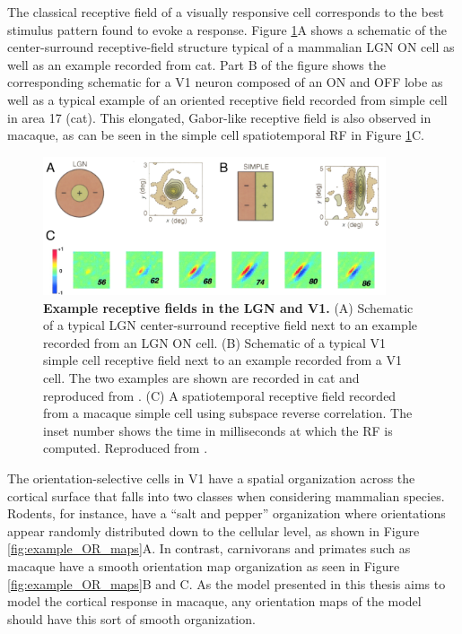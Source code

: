 \documentclass[phd,ianc,twoside]{infthesis}
\begin{document}
The classical receptive field of a visually responsive cell corresponds
to the best stimulus pattern found to evoke a response. Figure
\ref{fig:example_RFs}A shows a schematic of the center-surround
receptive-field structure typical of a mammalian LGN ON cell as well as
an example recorded from cat. Part B of the figure shows the
corresponding schematic for a V1 neuron composed of an ON and OFF lobe
as well as a typical example of an oriented receptive field recorded
from simple cell in area 17 (cat). This elongated, Gabor-like receptive
field is also observed in macaque, as can be seen in the simple cell
spatiotemporal RF in Figure \ref{fig:example_RFs}C.

\begin{figure}
\center
\includegraphics[width=0.9\textwidth]{./figures/example_RFs.pdf}
\caption{{\bf Example receptive fields in the LGN and V1.} (A) Schematic
  of a typical LGN center-surround receptive field next to an example
  recorded from an LGN ON cell. (B) Schematic of a typical V1 simple cell
  receptive field next to an example recorded from a V1 cell. The two
  examples are shown are recorded in cat and reproduced from
  \citet{deangelis_tin95}. (C) A spatiotemporal receptive field recorded
  from a macaque simple cell using subspace reverse correlation. The
  inset number shows the time in milliseconds at which the RF is
  computed. Reproduced from \citet{dario_jneurophys01}.}
\label{fig:example_RFs}
\end{figure}


The orientation-selective cells in V1 have a spatial
organization across the cortical surface that falls into two classes
when considering mammalian species. Rodents, for instance, have a ``salt
and pepper'' organization where orientations appear randomly distributed
down to the cellular level, as shown in Figure \ref{fig:example_OR_maps}A.
In contrast, carnivorans and primates such as macaque have a smooth orientation map
organization as seen in Figure \ref{fig:example_OR_maps}B and C. As the
model presented in this thesis aims to model the cortical response in
macaque, any orientation maps of the model should have this sort of
smooth organization.
\end{document}
